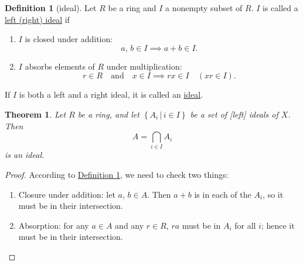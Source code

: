 \documentclass[a4paper,10pt]{scrreprt}
\newcommand{\defn}[1]{\ul{#1}}
\theoremstyle{definition}
\newtheorem{definition}{Definition}[section]
\theoremstyle{plain}
\newtheorem{theorem}{Theorem}[section]
\theoremstyle{remark}
\begin{document}
\begin{definition}[ideal]
  \label{def:ideal}
  Let $R$ be a ring and $I$ a nonempty subset of $R$. $I$ is called a \defn{left (right) ideal} if
  \begin{enumerate}
    \item $I$ is closed under addition:
      \begin{equation*}
        a,\,b \in I \implies a+b\in I.
      \end{equation*}

    \item $I$ absorbs elements of $R$ under multiplication:
      \begin{equation*}
        r \in R \quad\text{and}\quad x\in I \implies rx \in I\quad (xr \in I).
      \end{equation*}
  \end{enumerate}
  If $I$ is both a left and a right ideal, it is called an \defn{ideal}.
\end{definition}
\begin{theorem}
  Let $R$ be a ring, and let $\left\{ A_{i}\,\big|\, i \in I \right\}$ be a set of [left] ideals of $X$. Then 
  \begin{equation*}
    A = \bigcap_{i \in I}A_{i}
  \end{equation*}
  is an ideal.
  \label{thm:intersectionofidealsisideal}
\end{theorem}
\begin{proof}
  According to \hyperref[def:ideal]{Definition \ref*{def:ideal}}, we need to check two things:
  \begin{enumerate}
    \item Closure under addition: let $a$, $b\in A$. Then $a+b$ is in each of the $A_{i}$, so it must be in their intersection.
    \item Absorption: for any $a \in A$ and any $r \in R$, $ra$ must be in $A_{i}$ for all $i$; hence it must be in their intersection.
  \end{enumerate}
\end{proof}
\end{document}
